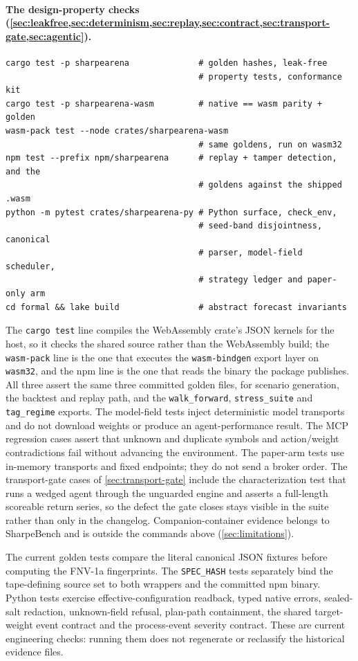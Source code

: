 \paragraph{The design-property checks (\cref{sec:leakfree,sec:determinism,sec:replay,sec:contract,sec:transport-gate,sec:agentic}).}
\begin{verbatim}
cargo test -p sharpearena              # golden hashes, leak-free
                                       # property tests, conformance kit
cargo test -p sharpearena-wasm         # native == wasm parity + golden
wasm-pack test --node crates/sharpearena-wasm
                                       # same goldens, run on wasm32
npm test --prefix npm/sharpearena      # replay + tamper detection, and the
                                       # goldens against the shipped .wasm
python -m pytest crates/sharpearena-py # Python surface, check_env,
                                       # seed-band disjointness, canonical
                                       # parser, model-field scheduler,
                                       # strategy ledger and paper-only arm
cd formal && lake build                # abstract forecast invariants
\end{verbatim}
The \texttt{cargo test} line compiles the WebAssembly crate's JSON kernels for the host, so it checks the shared source rather than the WebAssembly build; the \texttt{wasm-pack} line is the one that executes the \texttt{wasm-bindgen} export layer on \texttt{wasm32}, and the npm line is the one that reads the binary the package publishes. All three assert the same three committed golden files, for scenario generation, the backtest and replay path, and the \texttt{walk\_forward}, \texttt{stress\_suite} and \texttt{tag\_regime} exports. The model-field tests inject deterministic model transports and do not download weights or produce an agent-performance result. The MCP regression cases assert that unknown and duplicate symbols and action/weight contradictions fail without advancing the environment. The paper-arm tests use in-memory transports and fixed endpoints; they do not send a broker order. The transport-gate cases of \cref{sec:transport-gate} include the characterization test that runs a wedged agent through the unguarded engine and asserts a full-length scoreable return series, so the defect the gate closes stays visible in the suite rather than only in the changelog. Companion-container evidence belongs to SharpeBench and is outside the commands above (\cref{sec:limitations}).

The current golden tests compare the literal canonical JSON fixtures before computing the FNV-1a fingerprints. The \texttt{SPEC\_HASH} tests separately bind the tape-defining source set to both wrappers and the committed npm binary. Python tests exercise effective-configuration readback, typed native errors, sealed-salt redaction, unknown-field refusal, plan-path containment, the shared target-weight event contract and the process-event severity contract. These are current engineering checks: running them does not regenerate or reclassify the historical evidence files.

